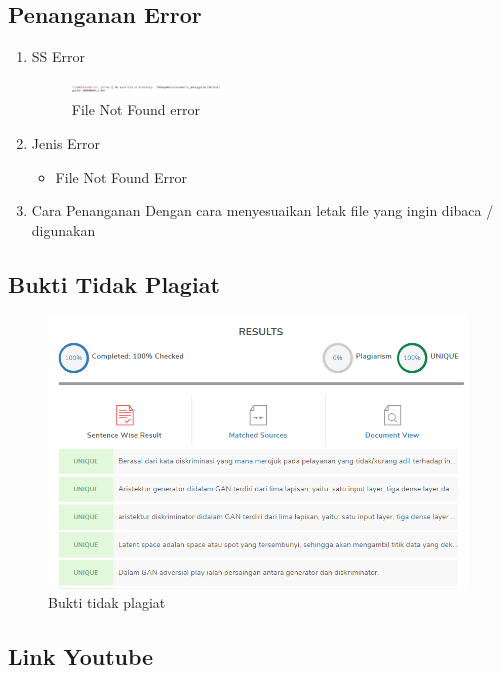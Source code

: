 \subsection{Penanganan Error}
\begin{enumerate}
	\item SS Error
	\begin{figure}[H]
		\includegraphics[width=4cm]{figures/1174087/8/error.png}
		\centering
		\caption{File Not Found error}
	\end{figure}
	\item Jenis Error
	\begin{itemize}
		\item File Not Found Error
	\end{itemize}
	\item Cara Penanganan
	\hfill\break
	Dengan cara menyesuaikan letak file yang ingin dibaca / digunakan
\end{enumerate}

\subsection{Bukti Tidak Plagiat}
\begin{figure}[H]
	\centering
	\includegraphics[width=12cm]{figures/1174087/8/plagiat.png}
	\caption{Bukti tidak plagiat}
\end{figure}

\subsection{Link Youtube}
